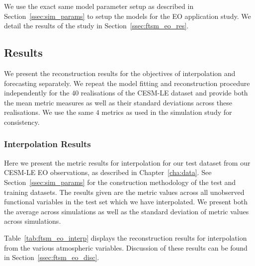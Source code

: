 We use the exact same model parameter setup as described in Section~\ref{ssec:sim_params} to setup the models for the EO application study.
We detail the results of the study in Section~\ref{ssec:ftsm_eo_res}.

\subsection{Results \label{ssec:ftsm_eo_res}}
We present the reconstruction results for the objectives of interpolation and forecasting separately. 
We repeat the model fitting and reconstruction procedure independently for the $40$ realisations of the CESM-LE dataset and provide both the mean metric measures as well as their standard deviations across these realisations. 
We use the same $4$ metrics as used in the simulation study for consistency. 

\subsubsection{Interpolation Results}
Here we present the metric results for interpolation for our test dataset from our CESM-LE EO observations, as described in Chapter~\ref{cha:data}.
See Section~\ref{ssec:sim_params} for the construction methodology of the test and training datasets. 
The results given are the metric values across all unobserved functional variables in the test set which we have interpolated.
We present both the average across simulations as well as the standard deviation of metric values across simulations.

Table~\ref{tab:ftsm_eo_interp} displays the reconstruction results for interpolation from the various atmospheric variables.
Discussion of these results can be found in Section~\ref{ssec:ftsm_eo_disc}.

